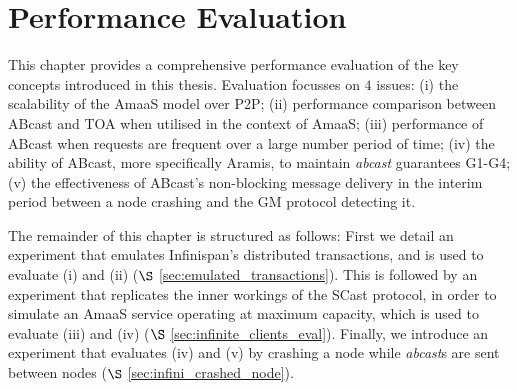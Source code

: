 \chapter{Performance Evaluation}\label{ch:perf_eval}
    \graphicspath{{Chapter6-PerformanceEvaluation/Figs/Vector/}{Chapter6-PerformanceEvaluation/Figs/}}
    
    This chapter provides a comprehensive performance evaluation of the key concepts introduced in this thesis.  Evaluation focusses on $4$ issues: (i) the scalability of the \textsf{AmaaS} model over P2P; (ii) performance comparison between \textsf{ABcast} and TOA when utilised in the context of \textsf{AmaaS}; (iii) performance of \textsf{ABcast} when requests are frequent over a large number period of time; (iv) the ability of \textsf{ABcast}, more specifically \textsf{Aramis}, to maintain  \emph{abcast} guarantees G1-G4; (v)  the effectiveness of \textsf{ABcast}'s non-blocking message delivery in the interim period between a node crashing and the GM protocol detecting it.  
   
    The remainder of this chapter is structured as follows: First we detail an experiment that emulates Infinispan's distributed transactions, and is used to evaluate (i) and (ii) ($\S$ \ref{sec:emulated_transactions}).  This is followed by an experiment that replicates the inner workings of the \textsf{SCast} protocol, in order to simulate an \textsf{AmaaS} service operating at maximum capacity, which is used to evaluate (iii) and (iv) ($\S$ \ref{sec:infinite_clients_eval}).  Finally, we introduce an experiment that evaluates (iv) and (v) by crashing a node while \emph{abcast}s are sent between nodes ($\S$ \ref{sec:infini_crashed_node}).  


